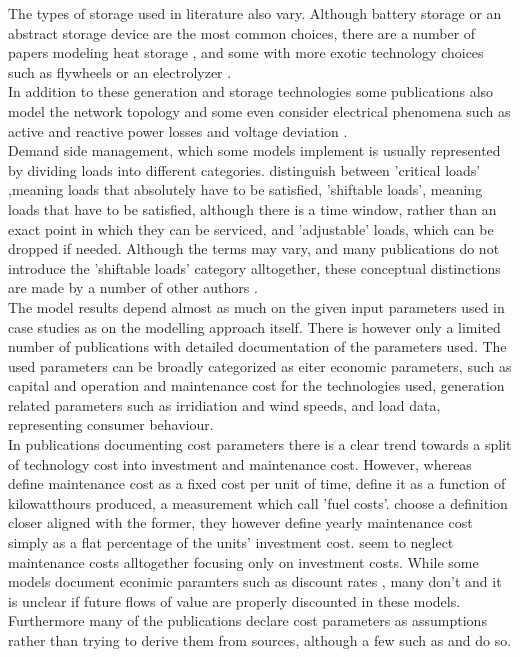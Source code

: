 \documentclass[
	11pt,								%
	DIV10,								%
	a4paper,         					%
	oneside,							%
	headheight=20pt,					%
	footheight=20pt,					%
    parskip=full,						%
    listof=totoc,						%
	bibliography=totoc,					%
	index=totoc,						%
]{scrartcl}
\begin{document}
The types of storage used in literature also vary. Although battery storage \cite{7399422}\cite{UMEOZOR2016272}\cite{6465822} or an abstract storage device \cite{6669807}\cite{zhang2011optimal} are the most common choices, there are a number of papers modeling heat storage \cite{zhang2013efficient}\cite{zhang2015optimal}\cite{LAUINGER201624}\cite{wouters2015energy}, and some with more exotic technology choices such as flywheels \cite{6700453} or an electrolyzer \cite{7125149}.
\\
In addition to these generation and storage technologies some publications also model the network topology \cite{8023785}\cite{7972908}\cite{SHAMS2018326} and some even consider electrical phenomena such as active and reactive power losses \cite{7741704}\cite{mashayekhMixedIntegerLinear2017} and voltage deviation \cite{7741704}. 
\\
Demand side management, which some models implement is usually represented by dividing loads into different categories. \cite{7972908} distinguish between 'critical loads' ,meaning loads that absolutely have to be satisfied, 'shiftable loads', meaning loads that have to be satisfied, although there is a time window, rather than an exact point in which they can be serviced, and 'adjustable' loads, which can be dropped if needed. Although the terms may vary, and many publications do not introduce the 'shiftable loads' category alltogether, these conceptual distinctions are made by a number of other authors \cite{silvente2015rolling}\cite{zhang2015optimal}\cite{8216436}.
\\
The model results depend almost as much on the given input parameters used in case studies as on the modelling approach itself. There is however only a limited number of publications with detailed documentation of the parameters used.
The used parameters can be broadly categorized as eiter economic parameters, such as capital and operation and maintenance cost for the technologies used, generation related parameters such as irridiation and wind speeds, and load data, representing consumer behaviour.
\\
In publications documenting cost parameters there is a clear trend towards a split of technology cost into investment and maintenance cost. However, whereas \cite{LAUINGER201624} define maintenance cost as a fixed cost per unit of time, \cite{wouters2015energy} define it as a function of kilowatthours produced, a measurement which \cite{LAUINGER201624} call 'fuel costs'. \cite{7399422} choose a definition closer aligned with the former, they however define yearly maintenance cost simply as a flat percentage of the units' investment cost.\cite{KOLTSAKLIS2018318} seem to neglect maintenance costs alltogether focusing only on investment costs. While some models document econimic paramters such as discount rates \cite{7399422}, many don't and it is unclear if future flows of value are properly discounted in these models. Furthermore many of the publications declare cost parameters as assumptions rather than trying to derive them from sources, although a few such as \cite{LAUINGER201624} and \cite{wouters2015energy} do so.
\end{document}
